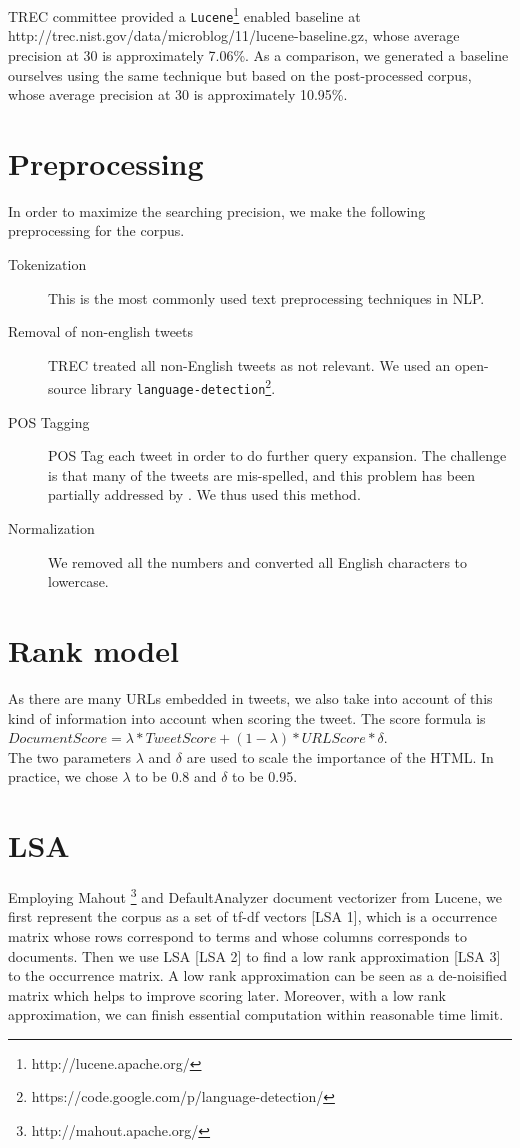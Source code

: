 \documentclass{acm_proc_article-sp}
\begin{document}
TREC committee provided a \texttt{Lucene}\footnote{http://lucene.apache.org/} enabled baseline at http://trec.nist.gov/data/microblog/11/lucene-baseline.gz, whose average precision at 30 is approximately 7.06\%. As a comparison, we generated a baseline ourselves using the same technique but based on the post-processed corpus, whose average precision at 30 is approximately 10.95\%.
   
\section{Preprocessing}
In order to maximize the searching precision, we make the following preprocessing for the corpus.
\begin{description}
\item[Tokenization] This is the most commonly used text preprocessing techniques in NLP.
\item[Removal of non-english tweets] TREC treated all non-English tweets as not relevant. We used an open-source library \texttt{language-detection}\footnote{https://code.google.com/p/language-detection/}.
\item[POS Tagging] POS Tag each tweet in order to do further query expansion. The challenge is that many of the tweets are mis-spelled, and this problem has been partially addressed by \cite{owoputi2013improved}. We thus used this method.
\item[Normalization] We removed all the numbers and converted all English characters to lowercase.
\end{description}

\section{Rank model}
As there are many URLs embedded in tweets, we also take into account of this kind of information into account when scoring the tweet. The score formula is\\ $DocumentScore = \lambda*TweetScore + (1-\lambda)*URLScore*\delta$.\\ The two parameters $\lambda$ and $\delta$ are used to scale the importance of the HTML. In practice, we chose $\lambda$ to be 0.8 and $\delta$ to be 0.95.


\section{LSA}
Employing Mahout \footnote{http://mahout.apache.org/} and DefaultAnalyzer document vectorizer from Lucene, we first represent the corpus as a set of tf-df vectors [LSA 1], which is a occurrence matrix whose rows correspond to terms and whose columns corresponds to documents. Then we use LSA [LSA 2] to find a low rank approximation [LSA 3] to the occurrence matrix. A low rank approximation can be seen as a de-noisified matrix which helps to improve scoring later. Moreover, with a low rank approximation, we can finish essential computation within reasonable time limit.
\end{document}
